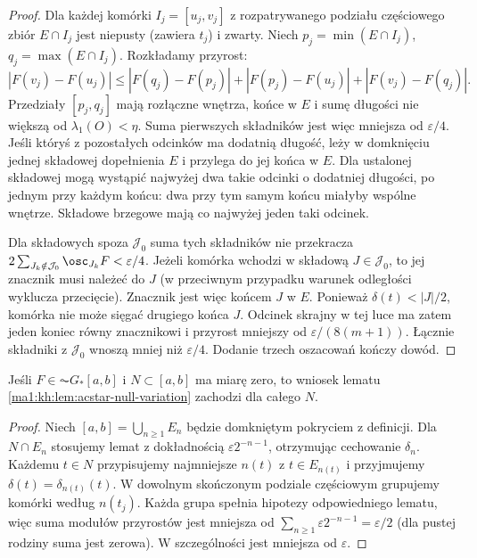 \begin{proof}
Dla każdej komórki $I_j=[u_j,v_j]$ z rozpatrywanego podziału częściowego zbiór $E\cap I_j$ jest niepusty (zawiera $t_j$) i zwarty. Niech $p_j=\min(E\cap I_j)$, $q_j=\max(E\cap I_j)$. Rozkładamy przyrost:
\[
 |F(v_j)-F(u_j)|
 \le |F(q_j)-F(p_j)|+|F(p_j)-F(u_j)|+|F(v_j)-F(q_j)|.
\]
Przedziały $[p_j,q_j]$ mają rozłączne wnętrza, końce w $E$ i sumę długości nie większą od $\lambda_1(O)<\eta$. Suma pierwszych składników jest więc mniejsza od $\varepsilon/4$. Jeśli któryś z pozostałych odcinków ma dodatnią długość, leży w domknięciu jednej składowej dopełnienia $E$ i przylega do jej końca w $E$. Dla ustalonej składowej mogą wystąpić najwyżej dwa takie odcinki o dodatniej długości, po jednym przy każdym końcu: dwa przy tym samym końcu miałyby wspólne wnętrze. Składowe brzegowe mają co najwyżej jeden taki odcinek.

Dla składowych spoza $\mathcal J_0$ suma tych składników nie przekracza $2\sum_{J_k\notin\mathcal J_0}\osc_{J_k}F<\varepsilon/4$. Jeżeli komórka wchodzi w składową $J\in\mathcal J_0$, to jej znacznik musi należeć do $J$ (w przeciwnym przypadku warunek odległości wyklucza przecięcie). Znacznik jest więc końcem $J$ w $E$. Ponieważ $\delta(t)<|J|/2$, komórka nie może sięgać drugiego końca $J$. Odcinek skrajny w tej luce ma zatem jeden koniec równy znacznikowi i przyrost mniejszy od $\varepsilon/(8(m+1))$. Łącznie składniki z $\mathcal J_0$ wnoszą mniej niż $\varepsilon/4$. Dodanie trzech oszacowań kończy dowód.
\end{proof}

\begin{wniosek}
\label{ma1:kh:cor:acgstar-null-variation}\label{it:cor:acgstar-null-variation}
Jeśli $F\in\AC G_*[a,b]$ i $N\subset[a,b]$ ma miarę zero, to wniosek lematu \ref{ma1:kh:lem:acstar-null-variation} zachodzi dla całego $N$.
\end{wniosek}
\begin{proof}
Niech $[a,b]=\bigcup_{n\ge1}E_n$ będzie domkniętym pokryciem z definicji. Dla $N\cap E_n$ stosujemy lemat z dokładnością $\varepsilon2^{-n-1}$, otrzymując cechowanie $\delta_n$. Każdemu $t\in N$ przypisujemy najmniejsze $n(t)$ z $t\in E_{n(t)}$ i przyjmujemy $\delta(t)=\delta_{n(t)}(t)$. W dowolnym skończonym podziale częściowym grupujemy komórki według $n(t_j)$. Każda grupa spełnia hipotezy odpowiedniego lematu, więc suma modułów przyrostów jest mniejsza od $\sum_{n\ge1}\varepsilon2^{-n-1}=\varepsilon/2$ (dla pustej rodziny suma jest zerowa). W szczególności jest mniejsza od $\varepsilon$.
\end{proof}

